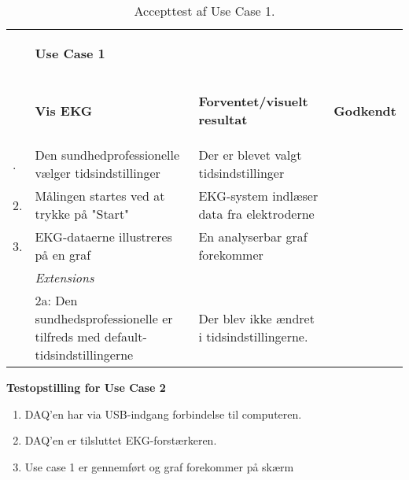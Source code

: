 \begin{table}[H]
    \begin{tabularx}{\textwidth}{l X X c}
     \toprule
     ~ & \begin{large}\textbf{Use Case 1} \end{large} & ~ & ~ \\  
     ~ & \begin{large}\textbf{Vis EKG} \end{large}	  
     & \begin{large} \textbf{Forventet/visuelt resultat}\end{large} 
     & \begin{large} \textbf{Godkendt} \end{large}      
     \\     	 \midrule \addlinespace[3mm]                                                                                                                                                                             					    
                         1. &  Den sundhedprofessionelle vælger tidsindstillinger
     					    &  Der er blevet valgt tidsindstillinger 
     					    &  %
     					    \\ \midrule  
     					 2. &  Målingen startes ved at trykke på "Start"
     					    &  EKG-system indlæser data fra elektroderne
     					    &  %
     					    \\ \midrule
     					 3. &  EKG-dataerne illustreres på en graf 
     					    &  En analyserbar graf forekommer
     					    &  %
     					    \\ \midrule   
                         ~  &  \textit{Extensions}
     					    &  ~  
     					    &  ~         \\	\midrule
                         ~  &  2a: Den sundhedsprofessionelle er tilfreds med default-tidsindstillingerne
     					    &  Der blev ikke ændret i tidsindstillingerne. 
     					    &  %
     					    \\
    					         					         	
	\bottomrule   
    \end{tabularx}
    \caption {Accepttest af Use Case 1.}
    \label{tab:AT_UC1}
\end{table}


\textbf{Testopstilling for Use Case 2}
\begin{enumerate}
	\item DAQ’en har via USB-indgang forbindelse til computeren.
	\item DAQ’en er tilsluttet EKG-forstærkeren.
	\item Use case 1 er gennemført og graf forekommer på skærm
\end{enumerate}

